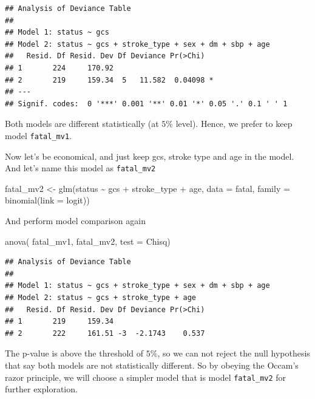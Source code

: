 \documentclass[
  10pt,
]{krantz}
\newenvironment{Shaded}{\begin{snugshade}}{\end{snugshade}}
\newcommand{\AttributeTok}[1]{\textcolor[rgb]{0.77,0.63,0.00}{#1}}
\newcommand{\FunctionTok}[1]{\textcolor[rgb]{0.00,0.00,0.00}{#1}}
\newcommand{\NormalTok}[1]{#1}
\newcommand{\OtherTok}[1]{\textcolor[rgb]{0.56,0.35,0.01}{#1}}
\newcommand{\SpecialCharTok}[1]{\textcolor[rgb]{0.00,0.00,0.00}{#1}}
\newcommand{\StringTok}[1]{\textcolor[rgb]{0.31,0.60,0.02}{#1}}
\begin{document}
\begin{verbatim}
## Analysis of Deviance Table
## 
## Model 1: status ~ gcs
## Model 2: status ~ gcs + stroke_type + sex + dm + sbp + age
##   Resid. Df Resid. Dev Df Deviance Pr(>Chi)  
## 1       224     170.92                       
## 2       219     159.34  5   11.582  0.04098 *
## ---
## Signif. codes:  0 '***' 0.001 '**' 0.01 '*' 0.05 '.' 0.1 ' ' 1
\end{verbatim}

Both models are different statistically (at \(5\%\) level). Hence, we prefer to keep model \texttt{fatal\_mv1}.

Now let's be economical, and just keep gcs, stroke type and age in the model. And let's name this model as \texttt{fatal\_mv2}

\begin{Shaded}
\begin{Highlighting}[]
\NormalTok{fatal\_mv2 }\OtherTok{\textless{}{-}} 
  \FunctionTok{glm}\NormalTok{(status }\SpecialCharTok{\textasciitilde{}}\NormalTok{ gcs }\SpecialCharTok{+}\NormalTok{ stroke\_type }\SpecialCharTok{+}\NormalTok{ age, }
      \AttributeTok{data =}\NormalTok{ fatal,}
      \AttributeTok{family =} \FunctionTok{binomial}\NormalTok{(}\AttributeTok{link =} \StringTok{\textquotesingle{}logit\textquotesingle{}}\NormalTok{))}
\end{Highlighting}
\end{Shaded}

And perform model comparison again

\begin{Shaded}
\begin{Highlighting}[]
\FunctionTok{anova}\NormalTok{( fatal\_mv1, }
\NormalTok{       fatal\_mv2, }\AttributeTok{test =} \StringTok{\textquotesingle{}Chisq\textquotesingle{}}\NormalTok{)}
\end{Highlighting}
\end{Shaded}

\begin{verbatim}
## Analysis of Deviance Table
## 
## Model 1: status ~ gcs + stroke_type + sex + dm + sbp + age
## Model 2: status ~ gcs + stroke_type + age
##   Resid. Df Resid. Dev Df Deviance Pr(>Chi)
## 1       219     159.34                     
## 2       222     161.51 -3  -2.1743    0.537
\end{verbatim}

The p-value is above the threshold of \(5\%\), so we can not reject the null hypothesis that say both models are not statistically different. So by obeying the Occam's razor principle, we will choose a simpler model that is model \texttt{fatal\_mv2} for further exploration.
\end{document}
